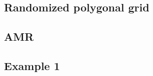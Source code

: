 \documentclass[preprint,10pt]{elsarticle}
\renewcommand{\(}{\left(}
\renewcommand{\)}{\right)}
\renewcommand{\[}{\left[}
\renewcommand{\]}{\right]}
\begin{document}
\subsection{Randomized polygonal grid}

\subsection{AMR}



\subsection{Example 1} \label{sec:ex1}







\end{document}
